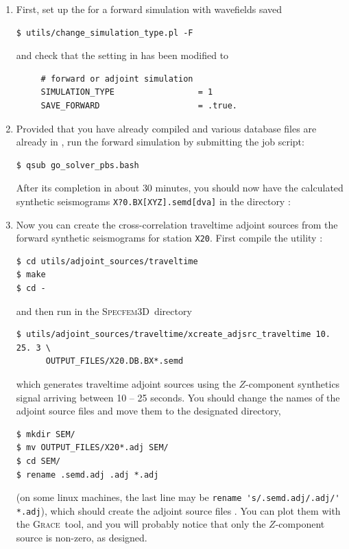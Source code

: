 \documentclass[10pt,fleqn,letterpaper]{article}
\newcommand{\specfem}{\textsc{Specfem3D}}
\newcommand{\grace}{\textsc{Grace}}
\begin{document}
\begin{enumerate}
\item First, set up the  for a forward simulation with wavefields saved
%
\begin{lstlisting}
$ utils/change_simulation_type.pl -F
\end{lstlisting}
and check that the setting in  has been modified to
\begin{lstlisting}
     # forward or adjoint simulation
     SIMULATION_TYPE                 = 1
     SAVE_FORWARD                    = .true.
\end{lstlisting}

\item Provided that you have already compiled  and various database files are already in ,
  run the forward simulation by submitting the job script:

\begin{lstlisting}
$ qsub go_solver_pbs.bash
\end{lstlisting}

After its completion in about $30$ minutes, you should now have the calculated synthetic seismograms \texttt{X?0.BX[XYZ].semd[dva]} in the directory :

\item Now you can create the cross-correlation traveltime adjoint sources from the forward synthetic seismograms for station \verb+X20+. First compile the utility :

\begin{lstlisting}
$ cd utils/adjoint_sources/traveltime
$ make
$ cd -
\end{lstlisting}
and then run in the \specfem\ directory
\begin{lstlisting}
$ utils/adjoint_sources/traveltime/xcreate_adjsrc_traveltime 10. 25. 3 \
      OUTPUT_FILES/X20.DB.BX*.semd
\end{lstlisting}
which generates traveltime adjoint sources using the $Z$-component synthetics signal arriving between 10 -- 25 seconds. You should change the names of the adjoint source files and move them to the designated directory,
\begin{lstlisting}
$ mkdir SEM/
$ mv OUTPUT_FILES/X20*.adj SEM/
$ cd SEM/
$ rename .semd.adj .adj *.adj
\end{lstlisting}
(on some linux machines, the last line may be \lstinline{rename 's/.semd.adj/.adj/' *.adj}), which should create the adjoint source files . You can plot them with the \grace\ tool, and you will probably notice that only the $Z$-component source is non-zero, as designed.


\end{enumerate}
\end{document}
